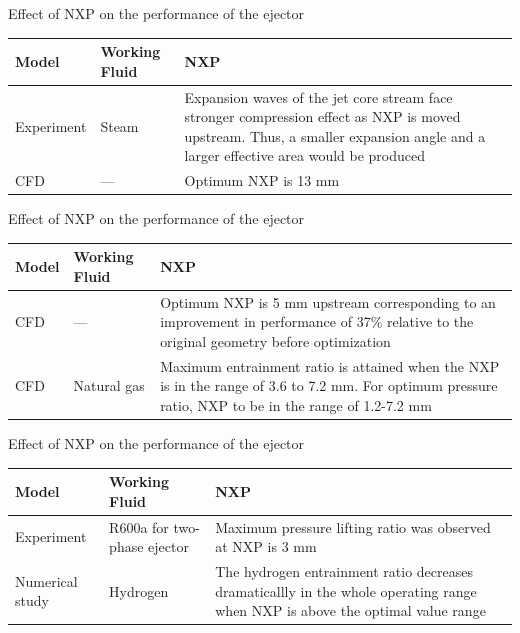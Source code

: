 \begin{frame}{Effect of NXP on the performance of the ejector\cite{tashtoush2019comprehensive}}
    \begin{table}[h]
        \centering
        \begin{tabular}{|p{2cm}|p{1.5cm}|p{5cm}|}
        \hline
            Model & Working Fluid & NXP\\
        \hline
             Experiment \cite{chunnanond2004ejectors} & Steam & Expansion waves of the jet core stream face stronger compression effect as NXP is moved upstream. Thus, a smaller expansion angle and a larger effective area would be produced\\
        \hline
             CFD\cite{hakkaki2015computational} & --- & Optimum NXP is 13 mm\\
        \hline
        \end{tabular}
    \end{table}
\end{frame}

\begin{frame}{Effect of NXP on the performance of the ejector\cite{tashtoush2019comprehensive}}
    \begin{table}[h]
        \centering
        \begin{tabular}{|p{2cm}|p{1.5cm}|p{5.5cm}|}
        \hline
            Model & Working Fluid & NXP\\
        \hline
             CFD \cite{omidvar2016entropy} & --- & Optimum NXP is 5 mm upstream corresponding to an improvement in performance of 37\% relative to the original geometry before optimization  \\
        \hline
             CFD\cite{chen2013numerical} & Natural gas & Maximum entrainment ratio is attained when the NXP is in the range of 3.6 to 7.2 mm. For optimum pressure ratio, NXP to be in the range of 1.2-7.2 mm\\
        \hline
        \end{tabular}
    \end{table}
\end{frame}

\begin{frame}{Effect of NXP on the performance of the ejector\cite{tashtoush2019comprehensive}}
    \begin{table}[h]
        \centering
        \begin{tabular}{|p{2cm}|p{1.5cm}|p{5cm}|}
        \hline
            Model & Working Fluid & NXP\\
        \hline
             Experiment\cite{jeon2017performance} & R600a for two-phase ejector & Maximum pressure lifting ratio was observed at NXP is 3 mm  \\
        \hline
             Numerical study\cite{pei2019numerical} & Hydrogen & The hydrogen entrainment ratio decreases dramaticallly in the whole operating range when NXP is above the optimal value range\\
        \hline
        \end{tabular}
    \end{table}
\end{frame}

